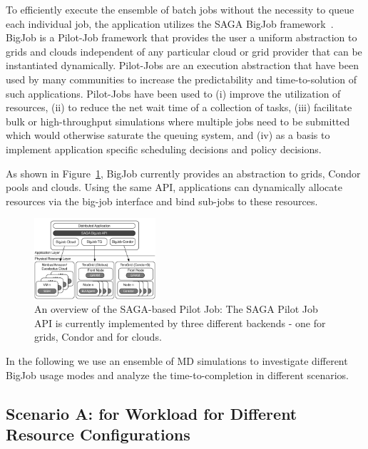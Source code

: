 \documentclass[3p,twocolumn]{elsarticle}
\begin{document}
To efficiently execute the ensemble of batch jobs without the necessity to queue 
each individual job, the application utilizes the SAGA BigJob 
framework~\cite{saga_bigjob_condor_cloud}. BigJob is a  
Pilot-Job framework that provides the user a uniform abstraction to grids and clouds
independent of any particular cloud or grid provider that can be
instantiated dynamically. Pilot-Jobs are an execution abstraction that have 
been used by many communities to increase the predictability and time-to-solution of
such applications.  Pilot-Jobs have been used to (i) improve the
utilization of resources, (ii) to reduce the net wait time of a
collection of tasks, (iii) facilitate bulk or high-throughput
simulations where multiple jobs need to be submitted which would
otherwise saturate the queuing system, and (iv) as a basis to
implement application specific scheduling decisions and policy
decisions.

As shown in Figure~\ref{fig:figures_distributed_pilot_job}, BigJob currently
provides an abstraction to grids, Condor pools and
clouds. Using the same API, applications can dynamically allocate
resources via the big-job interface and bind sub-jobs to these
resources. 

\begin{figure}[htbp]
    \centering
    \includegraphics[width=0.4\textwidth]{figures/distributed_pilot_job.pdf}
    \caption{
      \footnotesize
      \label{fig:figures_distributed_pilot_job}
      An overview of the SAGA-based Pilot Job:     The SAGA Pilot Job API 
      is currently implemented by three different backends - one for grids,
      Condor and for clouds.}
\end{figure}

In the following we use an ensemble of MD simulations to investigate different 
BigJob usage modes and analyze the time-to-completion \tc in different scenarios.


\subsection{Scenario A: \tc for Workload for Different Resource
  Configurations\\}
\end{document}
